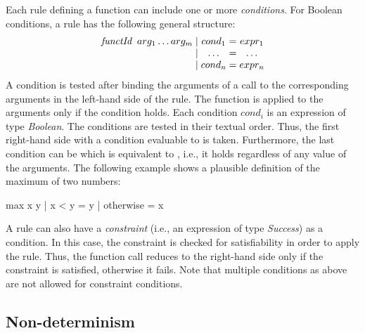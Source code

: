 Each rule defining a function
can include one or more \emph{conditions}.
For Boolean conditions, a rule has the following general
structure:
%
\[
\begin{array}{@{} l @{\;|\;} c @{\;=\;} c @{}}
\emph{functId} \;\; arg_1 \ldots arg_m & cond_1 & expr_1 \\
                           & \ldots & \ldots \\
                           & cond_n & expr_n
\end{array}
\]
%
A condition is tested after binding
the arguments of a call to the corresponding arguments
in the left-hand side of the rule.
The function is applied to the arguments only if the condition holds.
%
Each condition $cond_i$ is an expression of type \emph{Boolean}.
The conditions are tested in their textual order.
Thus, the first right-hand side with a condition evaluable to 
is taken. Furthermore, the last condition can be
 which is equivalent to ,
i.e., it holds regardless of any value of the arguments.
%
The following example shows a plausible definition of the maximum
of two numbers:
%
\begin{prog}
max x y | x < y     = y
        | otherwise = x
\end{prog}
%
A rule can also have a
\emph{constraint}
(i.e., an expression of type \emph{Success}) as a condition.
In this case, the constraint is checked for satisfiability
in order to apply the rule. Thus, the function call reduces
to the right-hand side only if the constraint is satisfied, otherwise
it fails. Note that multiple conditions as above are not allowed
for constraint conditions.


\subsection{Non-determinism}
\label{Non-determinism}

